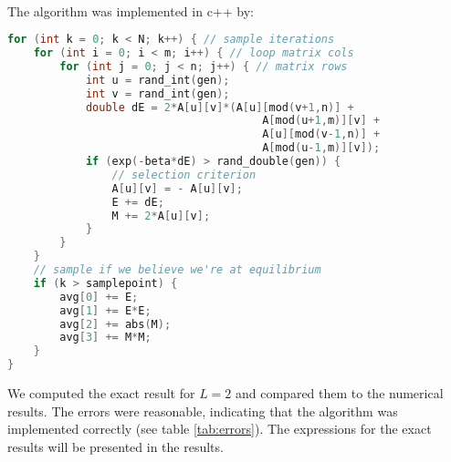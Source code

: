 \documentclass[11pt,english,a4paper]{article}
\begin{document}
\\
The algorithm was implemented in c++ by:
\begin{lstlisting}[language=c++]
for (int k = 0; k < N; k++) { // sample iterations
    for (int i = 0; i < m; i++) { // loop matrix cols  
        for (int j = 0; j < n; j++) { // matrix rows
            int u = rand_int(gen);
            int v = rand_int(gen);
            double dE = 2*A[u][v]*(A[u][mod(v+1,n)] + 
                                       A[mod(u+1,m)][v] +
                                       A[u][mod(v-1,n)] + 
                                       A[mod(u-1,m)][v]);
            if (exp(-beta*dE) > rand_double(gen)) {
                // selection criterion                
                A[u][v] = - A[u][v];
                E += dE; 
                M += 2*A[u][v];
            }
        }
    }
    // sample if we believe we're at equilibrium
    if (k > samplepoint) {
        avg[0] += E;
        avg[1] += E*E;
        avg[2] += abs(M);
        avg[3] += M*M;
    }
}
\end{lstlisting}
We computed the exact result for $L=2$ and compared them to the numerical results. The errors were reasonable, indicating that the algorithm was implemented correctly (see table \ref{tab:errors}). The expressions for the exact results will be presented in the results.\\
\\
\end{document}
